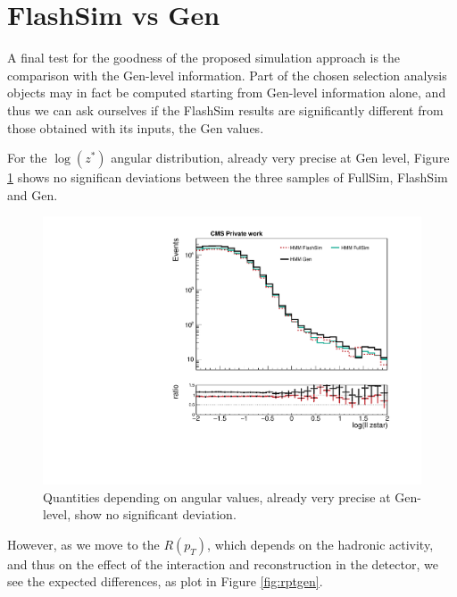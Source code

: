 \section{FlashSim vs Gen}

A final test for the goodness of the proposed simulation approach is the comparison with the Gen-level information. Part of the chosen selection analysis objects may in fact be computed starting from Gen-level information alone, and thus we can ask ourselves if the FlashSim results are significantly different from those obtained with its inputs, the Gen values.

For the $\log(z^*)$ angular distribution, already very precise at Gen level, Figure \ref{fig:zstargen} shows no significan deviations between the three samples of FullSim, FlashSim and Gen.

\begin{figure}
    \centering
    \includegraphics[width=\linewidth]{gfx/ch6/gen_vs_flash_ll_zstar_log___PreSel_log.pdf}
    \caption[Gen vs FlashSim for $z^*$]{Quantities depending on angular values, already very precise at Gen-level, show no significant deviation.}
    \label{fig:zstargen}
   \end{figure}
 
However, as we move to the $R(p_T)$, which depends on the hadronic activity, and thus on the effect of the interaction and reconstruction in the detector, we see the expected differences, as plot in Figure \ref{fig:rptgen}.

